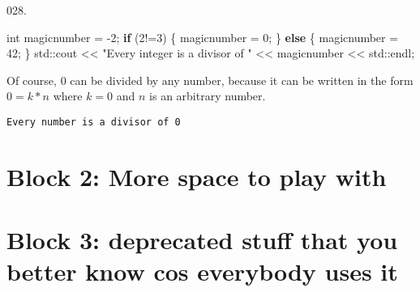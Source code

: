 \documentclass[]{book}
\newenvironment{Shaded}{}{}
\newcommand{\BuiltInTok}[1]{#1}
\newcommand{\ControlFlowTok}[1]{\textcolor[rgb]{0.00,0.44,0.13}{\textbf{#1}}}
\newcommand{\DataTypeTok}[1]{\textcolor[rgb]{0.56,0.13,0.00}{#1}}
\newcommand{\DecValTok}[1]{\textcolor[rgb]{0.25,0.63,0.44}{#1}}
\newcommand{\NormalTok}[1]{#1}
\newcommand{\StringTok}[1]{\textcolor[rgb]{0.25,0.44,0.63}{#1}}
\begin{document}
\vspace{2mm}\noindent\hrulefill{}

\begin{minipage}{\linewidth}\noindent
{\tiny 028.}\\
\begin{minipage}[t]{.485\linewidth}

\begin{framed}

\begin{Shaded}
\begin{Highlighting}[]
\DataTypeTok{int}\NormalTok{ magicnumber = }\DecValTok{-2}\NormalTok{;}
\ControlFlowTok{if}\NormalTok{ (}\DecValTok{2}\NormalTok{!=}\DecValTok{3}\NormalTok{) \{}
\NormalTok{  magicnumber = }\DecValTok{0}\NormalTok{;}
\NormalTok{\} }\ControlFlowTok{else}\NormalTok{ \{}
\NormalTok{  magicnumber = }\DecValTok{42}\NormalTok{;}
\NormalTok{\}}
\BuiltInTok{std::}\NormalTok{cout << }\StringTok{"Every integer is a divisor of "}
\NormalTok{          << magicnumber << }\BuiltInTok{std::}\NormalTok{endl;}
\end{Highlighting}
\end{Shaded}

\end{framed}

\end{minipage}
\hfill
\begin{minipage}[t]{.485\linewidth}

Of course, \(0\) can be divided by any number, because it can be written
in the form \(0 = k*n\) where \(k=0\) and \(n\) is an arbitrary number.

\begin{framed}

\begin{verbatim}
Every number is a divisor of 0
\end{verbatim}

\end{framed}

\end{minipage}
\end{minipage}

\hypertarget{block-2-more-space-to-play-with}{%
\chapter{Block 2: More space to play
with}\label{block-2-more-space-to-play-with}}

\hypertarget{block-3-deprecated-stuff-that-you-better-know-cos-everybody-uses-it}{%
\chapter{\texorpdfstring{Block 3: \textbf{deprecated} stuff that you
better know cos everybody uses
it}{Block 3: deprecated stuff that you better know cos everybody uses it}}\label{block-3-deprecated-stuff-that-you-better-know-cos-everybody-uses-it}}
\end{document}

